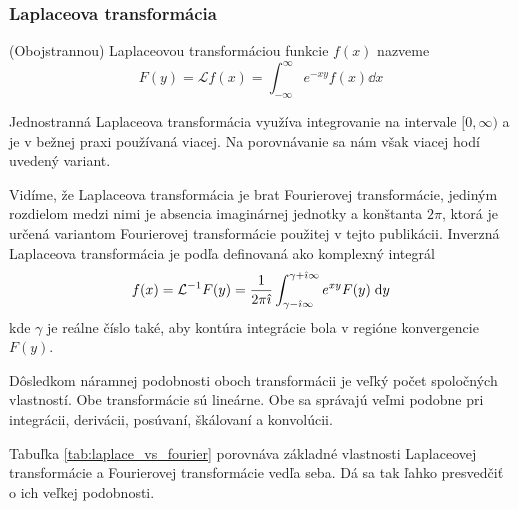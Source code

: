 \subsubsection{Laplaceova transformácia}
\begin{definicia}
(Obojstrannou) Laplaceovou transformáciou funkcie $f(x)$ nazveme
\begin{equation}
F(y) = \mathcal{L} f(x) = \int_{-\infty}^{\infty} e^{-xy} f(x) \dd x
\end{equation}
\end{definicia}
\begin{poznamka}
    Jednostranná Laplaceova transformácia využíva integrovanie na
    intervale $[0,\infty)$ a je v bežnej praxi používaná viacej. Na
    porovnávanie sa nám však viacej hodí uvedený variant.
\end{poznamka}
Vidíme, že Laplaceova transformácia je brat Fourierovej transformácie,
jediným rozdielom medzi nimi je absencia imaginárnej jednotky a
konštanta $2\pi$, ktorá je určená variantom Fourierovej transformácie
použitej v tejto publikácii.
Inverzná Laplaceova transformácia je podľa \cite{lpt} 
definovaná ako komplexný integrál
\begin{equation}
    f(x) = \mathcal{L}^{-1} F(y) = \frac{1}{2 \pi \hat{\imath}}
        \int_{\gamma - \hat{\imath} \infty}^{\gamma + \hat{\imath} \infty}
        e^{x y} F(y) \; \mathrm{d} y
\end{equation}
kde $\gamma$ je reálne číslo také, aby kontúra  integrácie bola v
regióne konvergencie $F(y)$.

Dôsledkom náramnej podobnosti oboch transformácii je veľký počet
spoločných vlastností. Obe transformácie sú lineárne. Obe sa správajú
veľmi podobne pri integrácii, derivácii, posúvaní, škálovaní a
konvolúcii.

Tabuľka \ref{tab:laplace_vs_fourier} porovnáva základné vlastnosti
Laplaceovej transformácie a Fourierovej transformácie vedľa seba. Dá
sa tak ľahko presvedčiť o ich veľkej podobnosti.

